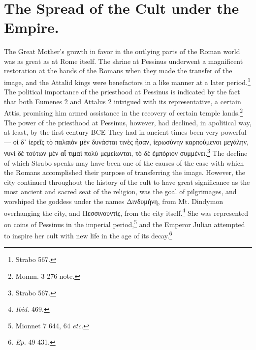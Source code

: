 \documentclass[a4paper, 11pt, oneside, polutonikogreek, english]{article}
\begin{document}
\section{The Spread of the Cult under the Empire.}
\paragraph{}
The Great Mother's growth in favor in the outlying parts of the Roman world was as great as at Rome itself. The shrine at Pessinus underwent a magnificent restoration at the hands of the Romans when they made the transfer of the image, and the Attalid kings were benefactors in a like manner at a later period.\footnote{Strabo 567.} The political importance of the priesthood at Pessinus is indicated by the fact that both Eumenes 2 and Attalus 2 intrigued with its representative, a certain Attis, promising him armed assistance in the recovery of certain temple lands.\footnote{Momm. 3 276 note.} The power of the priesthood at Pessinus, however, had declined, in apolitical way, at least, by the first century \textsc{BCE} They had in ancient times been very powerful --- οὶ δ᾽ ἱερεῖς τὸ παλαιὸν μὲν δυνάσται τινὲς ἦσαν, ἱερωσύνην καρπούμενοι μεγάλην, νυνὶ δὲ τούτων μὲν αἷ τιμαὶ πολὺ μεμείωνται, τὸ δὲ ἐμπόριον συμμένει.\footnote{Strabo 567.} The decline of which Strabo speaks may have been one of the causes of the ease with which the Romans accomplished their purpose of transferring the image. However, the city continued throughout the history of the cult to have great significance as the most ancient and sacred seat of the religion, was the goal of pilgrimages, and worshiped the goddess under the names Δινδυμήνη, from Mt. Dindymon overhanging the city, and Πεσσινουντίς, from the city itself.\footnote{\emph{Ibid.} 469.} She was represented on coins of Pessinus in the imperial period,\footnote{Mionnet 7 644, 64 \emph{etc.}} and the Emperor Julian attempted to inspire her cult with new life in the age of its decay.\footnote{\emph{Ep.} 49 431.}
\end{document}
